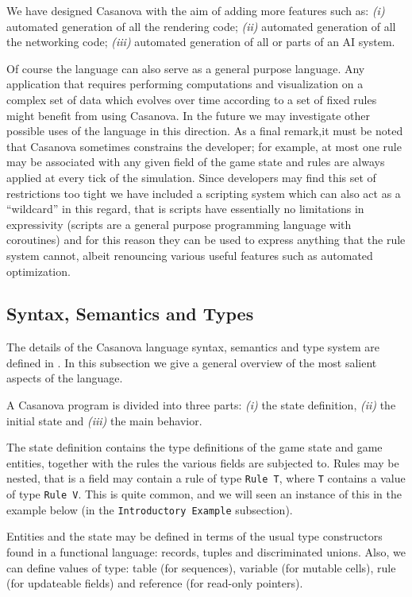 We have designed Casanova with the aim of adding more features such as: \textit{(i)} automated generation of all the rendering code; \textit{(ii)} automated generation of all the networking code; \textit{(iii)} automated generation of all or parts of an AI system.

Of course the language can also serve as a general purpose language. Any application that requires performing computations and visualization on a complex set of data which evolves over time according to a set of fixed rules might benefit from using Casanova. In the future we may investigate other possible uses of the language in this direction.
As a final remark,it must be noted that Casanova sometimes constrains the developer; for example, at most one rule may be associated with any given field of the game state and rules are always applied at every tick of the simulation. Since developers may find this set of restrictions too tight we have included a scripting system which can also act as a ``wildcard'' in this  regard, that is scripts have essentially no limitations in expressivity (scripts are a general purpose programming language with coroutines) and for this reason they can be used to express anything that the rule system cannot, albeit renouncing various useful features such as automated optimization.

\subsection{Syntax, Semantics and Types}
The details of the Casanova language syntax, semantics and type system are defined in \cite{CASANOVA_TR}. In this subsection we give a general overview of the most salient aspects of the language.

A Casanova program is divided into three parts: \textit{(i)} the state definition, \textit{(ii)} the initial state and \textit{(iii)} the main behavior.

The state definition contains the type definitions of the game state and game entities, together with the rules the various fields are subjected to. Rules may be nested, that is a field may contain a rule of type \texttt{Rule T}, where \texttt{T} contains a value of type \texttt{Rule V}. This is quite common, and we will seen an instance of this in the example below (in the \texttt{Introductory Example} subsection).

Entities and the state may be defined in terms of the usual type constructors found in a functional language: records, tuples and discriminated unions. Also, we can define values of type: table (for sequences), variable (for mutable cells), rule (for updateable fields) and reference (for read-only pointers).

